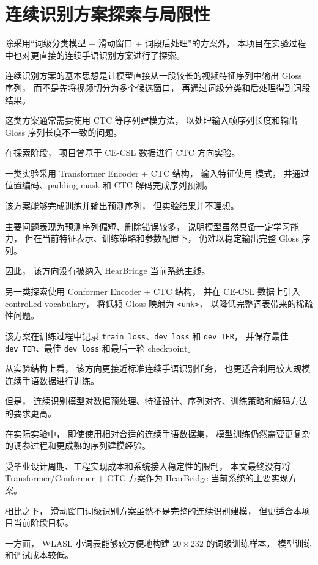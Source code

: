 
\section{连续识别方案探索与局限性}

除采用“词级分类模型 + 滑动窗口 + 词段后处理”的方案外，
本项目在实验过程中也对更直接的连续手语识别方案进行了探索。

连续识别方案的基本思想是让模型直接从一段较长的视频特征序列中输出 Gloss 序列，
而不是先将视频切分为多个候选窗口，
再通过词级分类和后处理得到词段结果。

这类方案通常需要使用 CTC 等序列建模方法，
以处理输入帧序列长度和输出 Gloss 序列长度不一致的问题。

在探索阶段，
项目曾基于 CE-CSL 数据进行 CTC 方向实验。

一类实验采用 Transformer Encoder + CTC 结构，
输入特征使用 \texttt{} 模式，
并通过位置编码、padding mask 和 CTC 解码完成序列预测。

该方案能够完成训练并输出预测序列，
但实验结果并不理想。

主要问题表现为预测序列偏短、删除错误较多，
说明模型虽然具备一定学习能力，
但在当前特征表示、训练策略和参数配置下，
仍难以稳定输出完整 Gloss 序列。

因此，
该方向没有被纳入 HearBridge 当前系统主线。

另一类探索使用 Conformer Encoder + CTC 结构，
并在 CE-CSL 数据上引入 controlled vocabulary，
将低频 Gloss 映射为 \texttt{<unk>}，
以降低完整词表带来的稀疏性问题。

该方案在训练过程中记录 \texttt{train\_loss}、\texttt{dev\_loss} 和 \texttt{dev\_TER}，
并保存最佳 \texttt{dev\_TER}、最佳 \texttt{dev\_loss} 和最后一轮 checkpoint。

从实验结构上看，
该方向更接近标准连续手语识别任务，
也更适合利用较大规模连续手语数据进行训练。

但是，
连续识别模型对数据预处理、特征设计、序列对齐、训练策略和解码方法的要求更高。

在实际实验中，
即使使用相对合适的连续手语数据集，
模型训练仍然需要更复杂的调参过程和更成熟的序列建模经验。

受毕业设计周期、工程实现成本和系统接入稳定性的限制，
本文最终没有将 Transformer/Conformer + CTC 方案作为 HearBridge 当前系统的主要实现方案。

相比之下，
滑动窗口词级识别方案虽然不是完整的连续识别建模，
但更适合本项目当前阶段目标。

一方面，
WLASL 小词表能够较方便地构建 $20\times232$ 的词级训练样本，
模型训练和调试成本较低。

